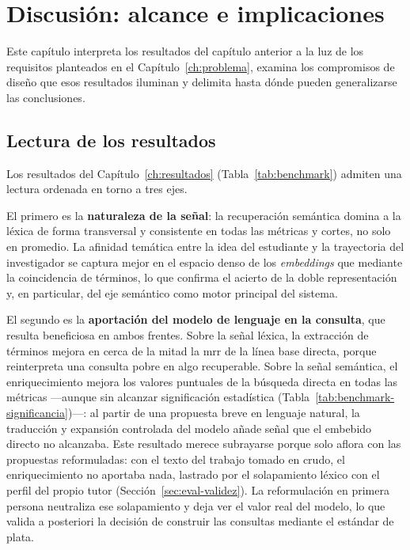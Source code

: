\chapter[Discusión]{Discusión: alcance e implicaciones}
\label{ch:discusion}

Este capítulo interpreta los resultados del capítulo anterior a la luz de los requisitos planteados en el Capítulo~\ref{ch:problema}, examina los compromisos de diseño que esos resultados iluminan y delimita hasta dónde pueden generalizarse las conclusiones.

\section{Lectura de los resultados}
\label{sec:disc-lectura}

Los resultados del Capítulo~\ref{ch:resultados} (Tabla~\ref{tab:benchmark}) admiten una lectura ordenada en torno a tres ejes.

El primero es la \textbf{naturaleza de la señal}: la recuperación semántica domina a la léxica de forma transversal y consistente en todas las métricas y cortes, no solo en promedio.
La afinidad temática entre la idea del estudiante y la trayectoria del investigador se captura mejor en el espacio denso de los \emph{embeddings} que mediante la coincidencia de términos, lo que confirma el acierto de la doble representación y, en particular, del eje semántico como motor principal del sistema.

El segundo es la \textbf{aportación del modelo de lenguaje en la consulta}, que resulta beneficiosa en ambos frentes.
Sobre la señal léxica, la extracción de términos mejora en cerca de la mitad la \gls{mrr} de la línea base directa, porque reinterpreta una consulta pobre en algo recuperable.
Sobre la señal semántica, el enriquecimiento mejora los valores puntuales de la búsqueda directa en todas las métricas ---aunque sin alcanzar significación estadística (Tabla~\ref{tab:benchmark-significancia})---: al partir de una propuesta breve en lenguaje natural, la traducción y expansión controlada del modelo añade señal que el embebido directo no alcanzaba.
Este resultado merece subrayarse porque solo aflora con las propuestas reformuladas: con el texto del trabajo tomado en crudo, el enriquecimiento no aportaba nada, lastrado por el solapamiento léxico con el perfil del propio tutor (Sección~\ref{sec:eval-validez}). La reformulación en primera persona neutraliza ese solapamiento y deja ver el valor real del modelo, lo que valida a posteriori la decisión de construir las consultas mediante el estándar de plata.

